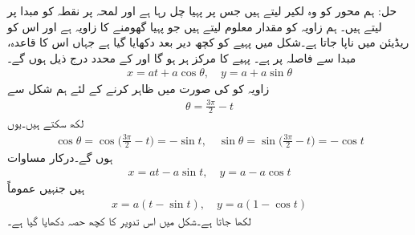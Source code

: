 حل:\quad
ہم  محور کو وہ لکیر لیتے ہیں جس پر پہیا چل رہا ہے اور لمحہ  پر نقطہ  کو مبدا پر لیتے ہیں۔ ہم زاویہ  کو مقدار معلوم لیتے ہیں جو پہیا  گھومنے کا زاویہ ہے اور اس کو ریڈیئن میں ناپا جاتا ہے۔شکل  میں پہیے کو کچھ دیر بعد دکھایا گیا ہے جہاں اس کا قاعدہ، مبدا سے  فاصلہ پر ہے۔ پہیے کا مرکز  ہر ہو گا اور  کے محدد درج ذیل ہوں گے۔
\begin{align*}
x=at+a\cos \theta,\quad y=a+a\sin \theta 
\end{align*}
زاویہ  کو  کی صورت میں ظاہر کرنے کے لئے ہم شکل سے 
\begin{align*}
\theta=\frac{3\pi}{2}-t
\end{align*}
لکھ سکتے ہیں۔یوں
\begin{align*}
\cos\theta=\cos\big(\frac{3\pi}{2}-t\big)=-\sin t,\quad \sin\theta=\sin\big(\frac{3\pi}{2}-t\big)=-\cos t
\end{align*}
ہوں گے۔درکار مساوات 
\begin{align*}
x=at-a\sin t,\quad y=a-a\cos t
\end{align*}
ہیں جنہیں عموماً
\begin{align}\label{مساوات_مخروط_تدویر_الف}
x=a(t-\sin t),\quad y=a(1-\cos t)
\end{align}
لکھا جاتا ہے۔شکل  میں اس تدویر کا کچھ حصہ دکھایا گیا ہے۔
